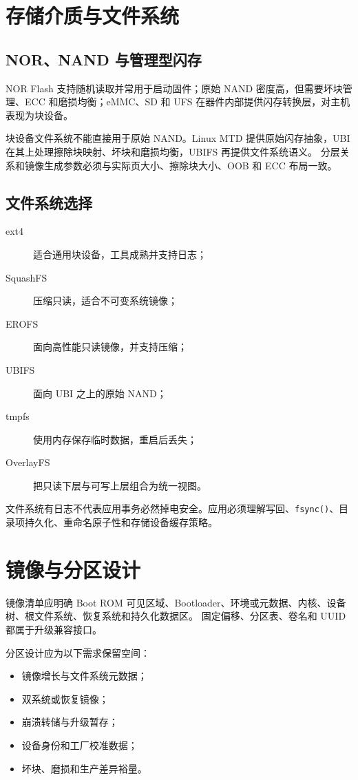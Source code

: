 \section{存储介质与文件系统}

\subsection{NOR、NAND 与管理型闪存}

NOR Flash 支持随机读取并常用于启动固件；原始 NAND 密度高，但需要坏块管理、ECC 和磨损均衡；eMMC、SD 和 UFS 在器件内部提供闪存转换层，对主机表现为块设备。

块设备文件系统不能直接用于原始 NAND。Linux MTD 提供原始闪存抽象，UBI 在其上处理擦除块映射、坏块和磨损均衡，UBIFS 再提供文件系统语义。
分层关系和镜像生成参数必须与实际页大小、擦除块大小、OOB 和 ECC 布局一致。

\subsection{文件系统选择}

\begin{description}
  \item[ext4] 适合通用块设备，工具成熟并支持日志；
  \item[SquashFS] 压缩只读，适合不可变系统镜像；
  \item[EROFS] 面向高性能只读镜像，并支持压缩；
  \item[UBIFS] 面向 UBI 之上的原始 NAND；
  \item[tmpfs] 使用内存保存临时数据，重启后丢失；
  \item[OverlayFS] 把只读下层与可写上层组合为统一视图。
\end{description}

文件系统有日志不代表应用事务必然掉电安全。应用必须理解写回、\texttt{fsync()}、目录项持久化、重命名原子性和存储设备缓存策略。

\section{镜像与分区设计}

镜像清单应明确 Boot ROM 可见区域、Bootloader、环境或元数据、内核、设备树、根文件系统、恢复系统和持久化数据区。
固定偏移、分区表、卷名和 UUID 都属于升级兼容接口。

分区设计应为以下需求保留空间：
\begin{itemize}
  \item 镜像增长与文件系统元数据；
  \item 双系统或恢复镜像；
  \item 崩溃转储与升级暂存；
  \item 设备身份和工厂校准数据；
  \item 坏块、磨损和生产差异裕量。
\end{itemize}

